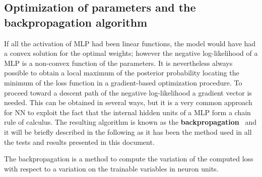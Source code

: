 





\subsection{Optimization of parameters and the backpropagation algorithm}


If all the activation of \acs{MLP} had been linear functions, the model would have had a convex solution for the optimal weights; however the negative log-likelihood of a \acl{MLP} is a non-convex function of the parameters. It is nevertheless always possible to obtain a local maximum of the posterior probability locating the minimum of the loss function in a gradient-based optimization procedure. 
To proceed toward a descent path of the negative log-likelihood a gradient vector is needed. This can be obtained in several ways, but it is a very common approach for NN to exploit the fact that the internal hidden units of a \acl{MLP} form a chain rule of calculus. The resulting algorithm is known as the \textbf{backpropagation}~\cite{NIPS2012_4824} and it will be briefly described in the following as it has been the method used in all the tests and results presented in this document. 

The backpropagation is a method to compute the variation of the computed loss with respect to a variation on the trainable variables in neuron units.

